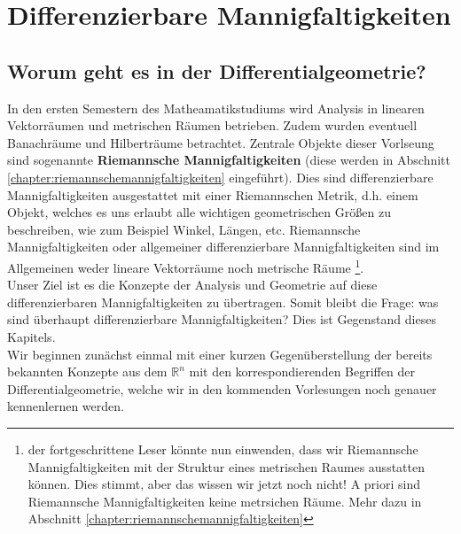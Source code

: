 \chapter{Differenzierbare Mannigfaltigkeiten}
\section*{Worum geht es in der Differentialgeometrie?}
In den ersten Semestern des Matheamatikstudiums wird Analysis in linearen Vektorräumen und  metrischen Räumen betrieben. 
Zudem wurden eventuell Banachräume und Hilberträume betrachtet.
Zentrale Objekte dieser Vorlseung sind sogenannte \textbf{Riemannsche Mannigfaltigkeiten} (diese werden in Abschnitt \ref{chapter:riemannschemannigfaltigkeiten}  eingeführt).
Dies sind differenzierbare Mannigfaltigkeiten ausgestattet mit einer Riemannschen Metrik, d.h. einem Objekt, 
welches es uns erlaubt alle wichtigen geometrischen Größen zu beschreiben, wie zum Beispiel Winkel, Längen, etc.
Riemannsche Mannigfaltigkeiten oder allgemeiner differenzierbare Mannigfaltigkeiten sind im Allgemeinen weder lineare Vektorräume noch metrische Räume 
\footnote{der fortgeschrittene Leser könnte nun einwenden, dass wir Riemannsche Mannigfaltigkeiten mit der Struktur eines metrischen Raumes ausstatten können. 
Dies stimmt, aber das wissen wir jetzt noch nicht! 
A priori sind Riemannsche Mannigfaltigkeiten keine metrsichen Räume. 
Mehr dazu in Abschnitt \ref{chapter:riemannschemannigfaltigkeiten}}.\\
Unser Ziel ist es die Konzepte der Analysis und Geometrie auf diese differenzierbaren Mannigfaltigkeiten zu übertragen.
Somit bleibt die Frage: was sind überhaupt differenzierbare Mannigfaltigkeiten?
Dies ist Gegenstand dieses Kapitels.\\
Wir beginnen zunächst einmal mit einer kurzen Gegenüberstellung der bereits bekannten Konzepte aus dem $\mathbb{R}^n$ mit den korrespondierenden Begriffen der Differentialgeometrie, welche wir in den kommenden Vorlesungen noch genauer kennenlernen werden.
